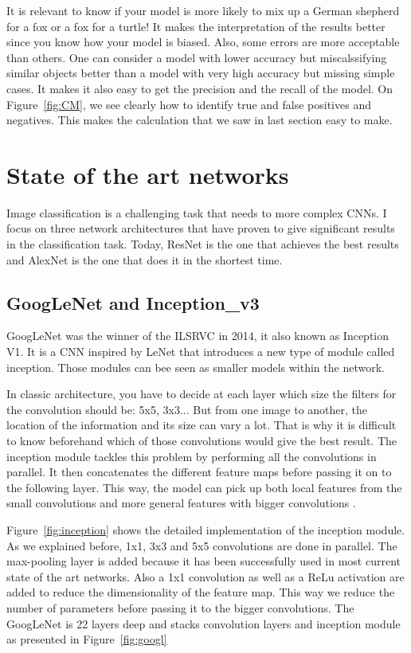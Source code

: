 It is relevant to know if your model is more likely to mix up  a German shepherd for a fox or a fox for a turtle! It makes the interpretation of the results better since you know how your model is biased. Also, some errors are more acceptable than others. One can consider a model with lower accuracy but miscalssifying similar objects better than a model with very high accuracy but missing simple cases. 
It makes it also easy to get the precision and the recall of the model. On Figure~\ref{fig:CM}, we see clearly how to identify true and false positives and negatives. This makes the calculation that we saw in last section easy to make. 



\section{State of the art networks}
Image classification is a challenging task that needs to more complex CNNs. I focus on three network architectures that have proven to give significant results in the classification task. Today, ResNet is the one that achieves the best results and AlexNet is the one that does it in the shortest time.    

\subsection{GoogLeNet and Inception\_v3}
GoogLeNet was the winner of the ILSRVC in 2014, it also known as Inception V1. It is a CNN inspired by LeNet that introduces a new type of module called inception. Those modules can bee seen as smaller models within the network. 

In classic architecture, you have to decide at each layer which size the filters for the convolution should be: 5x5, 3x3... But from one image to another, the location of the information and its size can vary a lot. That is why it is difficult to know beforehand which of those convolutions would give the best result. The inception module tackles this problem by performing all the convolutions in parallel. It then concatenates the different feature maps before passing it on to the following layer. This way, the model can pick up both local features from the small convolutions and more general features with bigger convolutions \cite{googlepaper}. 

Figure~\ref{fig:inception} shows the detailed implementation of the inception module. As we explained before, 1x1, 3x3 and 5x5 convolutions are done in parallel. The max-pooling layer is added because it has been successfully used in most current state of the art networks. Also a 1x1 convolution as well as a ReLu activation are added to reduce the dimensionality of the feature map. This way we reduce the number of parameters before passing it to the bigger convolutions. The GoogLeNet is 22 layers deep and stacks convolution layers and inception module as presented in Figure~\ref{fig:googl}

